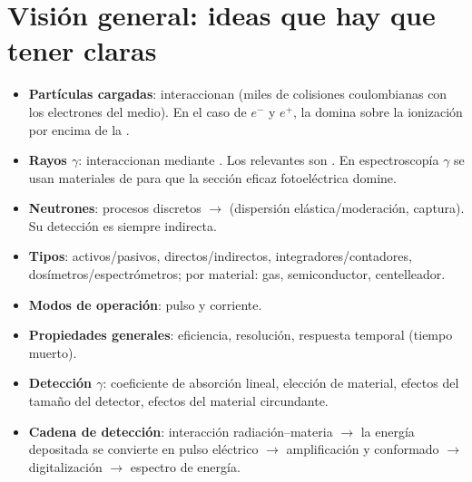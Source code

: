\chapter*{Visión general: ideas que hay que tener claras}

\begin{clave}
\begin{itemize}
\item \textbf{Partículas cargadas}: interaccionan  (miles de colisiones
coulombianas con los electrones del medio). En el caso de $e^-$ y $e^+$, la
 domina sobre la ionización por encima de la
.
\item \textbf{Rayos $\gamma$}: interaccionan mediante . Los relevantes son
. En espectroscopía $\gamma$
se usan materiales de  para que la sección eficaz fotoeléctrica domine.
\item \textbf{Neutrones}: procesos discretos $\rightarrow$  (dispersión
elástica/moderación, captura). Su detección es siempre indirecta.
\end{itemize}
\end{clave}

\begin{clave}
\begin{itemize}
\item \textbf{Tipos}: activos/pasivos, directos/indirectos, integradores/contadores,
dosímetros/espectrómetros; por material: gas, semiconductor, centelleador.
\item \textbf{Modos de operación}: pulso y corriente.
\item \textbf{Propiedades generales}: eficiencia, resolución, respuesta temporal (tiempo muerto).
\item \textbf{Detección $\gamma$}: coeficiente de absorción lineal, elección de material, efectos del
tamaño del detector, efectos del material circundante.
\item \textbf{Cadena de detección}: interacción radiación--materia $\rightarrow$ la energía depositada
se convierte en pulso eléctrico $\rightarrow$ amplificación y conformado $\rightarrow$ digitalización
$\rightarrow$ espectro de energía.
\end{itemize}
\end{clave}

